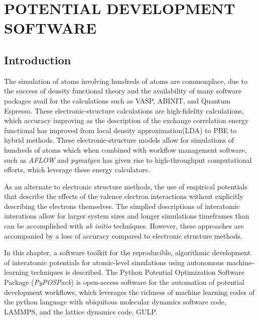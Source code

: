 \chapter{POTENTIAL DEVELOPMENT SOFTWARE}
\label{ch:software}

\section{Introduction}

The simulation of atoms involving hundreds of atoms are commonplace, due to the success of density functional theory\cite{hohenberg1964_dft,kohn1965_dft} and the availability of many software packages avail for the calculations such as VASP\cite{kresse1993_vasp,kresse1996_vasp1,kresse1996_vasp2}, ABINIT\cite{gonze2002_abinit,gonze2005_abinit,gonze2009_abinit,gonze2016_abinit}, and Quantum Espresso\cite{giannozzi2009_quantumespresso}.  
These electronic-structure calculations are high-fidelity calculations, which accuracy improving as the description of the exchange correlation energy functional has improved from local density approximation(LDA) to PBE to hybrid methods.
These electronic-structure models allow for simulations of hundreds of atoms which when combined with workflow management software, such as \emph{AFLOW}\cite{curtarolo2012_aflow} and \emph{pymatgen}\cite{ong2013_pymatgen} has given rise to high-throughput computational efforts, which leverage these energy calculators.

As an alternate to electronic structure methods, the use of empirical potentials that describe the effects of the valence electron interactions without explicitly describing the electrons themselves.  The simplied descriptions of interatomic interations allow for larger system sizes and longer simulations timeframes than can be accomplished with \emph{ab initio} techniques.  However, these approaches are accompanied by a loss of accuracy compared to electronic structure methods.

In this chapter, a software toolkit for the reproducible, algorithmic development of interatomic potentials for atomic-level simulations using autonomous machine-learning techniques is described.
The Python Potential Optimization Software Package (\emph{PyPOSPack}) is open-access software for the automation of potential development workflows, which leverages the richness of machine learning codes of the python language with ubiquitous molecular dynamics software code, LAMMPS\cite{plimpton1995_lammps}, and the lattice dynamics code, GULP\cite{gale2003_gulp}.


